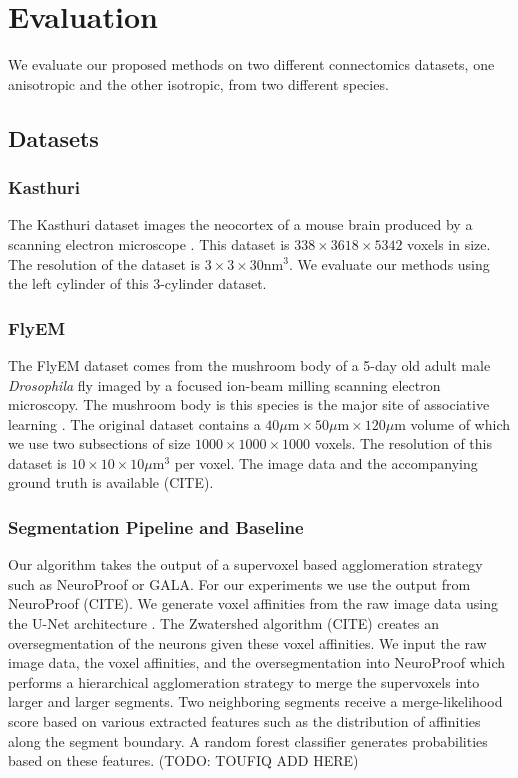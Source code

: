 \section{Evaluation}

We evaluate our proposed methods on two different connectomics datasets, one anisotropic and the other isotropic, from two different species. 

\subsection{Datasets}

\subsubsection{Kasthuri}
The Kasthuri dataset images the neocortex of a mouse brain produced by a scanning electron microscope \cite{kasthuri2015saturated}. 
This dataset is $338 \times 3618 \times  5342$ voxels in size. 
The resolution of the dataset is $3 \times 3 \times 30 \textrm{nm}^3$. 
We evaluate our methods using the left cylinder of this 3-cylinder dataset. 

\subsubsection{FlyEM}

The FlyEM dataset comes from the mushroom body of a 5-day old adult male \textit{Drosophila} fly imaged by a focused ion-beam milling scanning electron microscopy.  
The mushroom body is this species is the major site of associative learning \cite{takemura2017connectome}. 
The original dataset contains a $40 \mu\textrm{m} \times 50\mu\textrm{m} \times 120\mu\textrm{m}$ volume of which we use two subsections of size $1000 \times 1000 \times 1000$ voxels.  
The resolution of this dataset is $10 \times 10 \times 10 \mu\textrm{m}^3$ per voxel. 
The image data and the accompanying ground truth is available (CITE). 

\subsubsection{Segmentation Pipeline and Baseline}

Our algorithm takes the output of a supervoxel based agglomeration strategy such as NeuroProof or GALA. For our experiments we use the output from NeuroProof (CITE). We generate voxel affinities from the raw image data using the U-Net architecture \cite{ronneberger2015u}. The Zwatershed algorithm (CITE) creates an oversegmentation of the neurons given these voxel affinities. We input the raw image data, the voxel affinities, and the oversegmentation into NeuroProof which performs a hierarchical agglomeration strategy to merge the supervoxels into larger and larger segments. Two neighboring segments receive a merge-likelihood score based on various extracted features such as the distribution of affinities along the segment boundary. A random forest classifier generates probabilities based on these features. (TODO: TOUFIQ ADD HERE)



